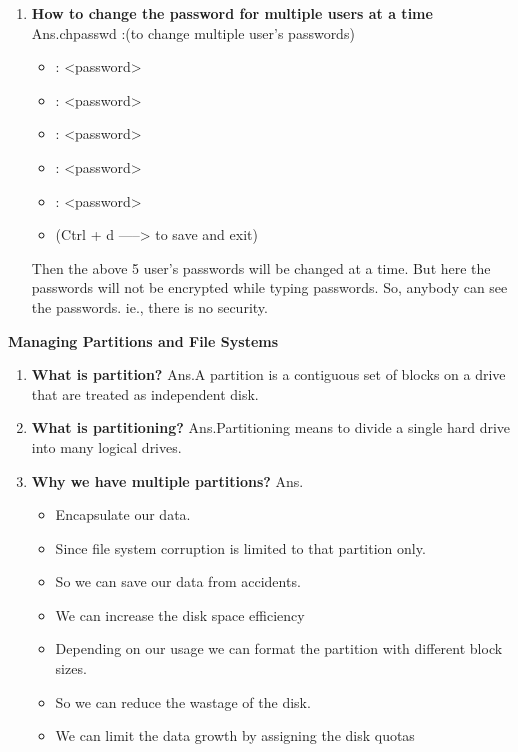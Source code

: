 \begin{enumerate}
\begin{enumerate}
    \item \textbf{How to change the password for multiple  users  at a time}
    \newline
    Ans.chpasswd :(to change multiple user's  passwords)
        \begin{itemize}
           \item <user name 1> : <password>
           \item  <user name 2> : <password>
           \item  <user name 3> : <password>
           \item <user name 4> : <password>
           \item <user name 5> : <password>
           \item (Ctrl + d    ----->   to save and exit)
	      \end{itemize}
        Then  the above 5 user's passwords will be changed at a time. But here the passwords will not be encrypted while typing passwords. So, anybody can see the passwords.  ie., there is no security.
\end{enumerate}   
    \bigskip 
    \bigskip
    \bigskip 

\textbf{Managing Partitions and File Systems}
   
\bigskip

\begin{enumerate}
   \item \textbf{What is partition?}
   \newline
    Ans.A partition is a contiguous set of blocks on a drive that are treated as independent disk. 
   
   \bigskip
   \bigskip
  
   \item \textbf{What is partitioning?}
   \newline
   Ans.Partitioning means to divide a single hard drive into many logical drives.

   \bigskip
   \bigskip

   \item \textbf{Why we have multiple partitions?}
   \newline
   Ans.\begin{itemize}
        \item Encapsulate our data.
        \item Since file system corruption is limited to that partition only.
        \item So we can save our data from accidents. 
        \item We can increase the disk space efficiency
        \item Depending on our usage we can format the partition with different block sizes.
        \item So we can reduce the wastage of the disk.
        \item We can limit the data growth by assigning the disk quotas
      \end{itemize}


\end{enumerate}
\end{enumerate}
